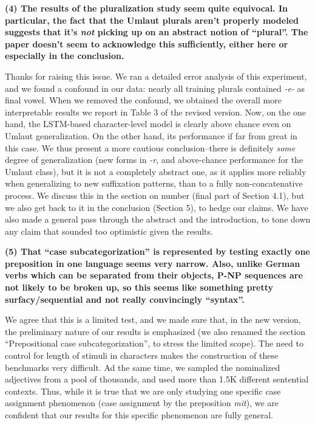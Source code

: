\documentclass{article}[11pt,a4paper,oneside]
\begin{document}
\textbf{(4) The results of the pluralization study seem quite equivocal. In particular, the fact that the Umlaut plurals aren't properly modeled suggests that it's \emph{not} picking up on an abstract notion of ``plural''. The paper doesn't seem to acknowledge this sufficiently, either here or especially in the conclusion.}

Thanks for raising this issue. We ran a detailed error analysis of this experiment, and we found a confound in our data: nearly all training plurals contained \textit{-e-} as final vowel. When we removed the confound, we obtained the overall more interpretable results we report in Table 3 of the revised version. Now, on the one hand, the LSTM-based character-level model is clearly above chance even on Umlaut generalization. On the other hand, its performance if far from great in this case. We thus present a more cautious conclusion--there is definitely \emph{some} degree of generalization (new forms in \textit{-r}, and above-chance performance for the Umlaut class), but it is not a completely abstract one, as it applies more reliably when generalizing to new suffixation patterns, than to a fully non-concatenative process. We discuss this in the section on number (final part of Section 4.1), but we also get back to it in the conclusion (Section 5), to hedge our claims. We have also made a general pass through the abstract and the introduction, to tone down any claim that sounded too optimistic given the results.
\newline

\textbf{(5) That ``case subcategorization'' is represented by testing exactly one preposition in one language seems very narrow. Also, unlike German verbs which can be separated from their objects, P-NP sequences are not likely to be broken up, so this seems like something pretty surfacy/sequential and not really convincingly ``syntax''.}

We agree that this is a limited test, and we made sure that, in the new version, the preliminary nature of our results is emphasized (we also renamed the section ``Prepositional case subcategorization'', to stress the limited scope). The need to control for length of stimuli in characters makes the construction of these benchmarks very difficult. Ad the same time, we sampled the nominalized adjectives from a pool of thousands, and used more than 1.5K different sentential contexts. Thus, while it is true that we are only studying one specific case assignment phenomenon (case assignment by the preposition \textit{mit}), we are confident that our results for this specific phenomenon are fully general.
\end{document}
